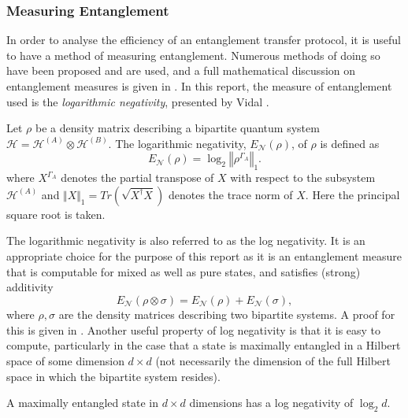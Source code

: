 \subsubsection{Measuring Entanglement}
\label{subsubsection:measure_entanglement}
In order to analyse the efficiency of an entanglement transfer protocol, it is useful to have a method of measuring entanglement.
Numerous methods of doing so have been proposed and are used, and a full
mathematical discussion on entanglement measures is given in \cite{Plenio_2007}.
In this report, the measure of entanglement used is the \emph{logarithmic negativity}, presented by Vidal \cite{Vidal_2002}.
\begin{definition}
    \label{definition:log_neg}
    Let $\rho$ be a density matrix describing a bipartite quantum system $\mathcal{H} = \mathcal{H}^{(A)} \otimes \mathcal{H}^{(B)}$.
    The logarithmic negativity, $E_\mathcal{N}(\rho)$, of $\rho$ is defined as
    \begin{equation}
        E_\mathcal{N}(\rho) = \log_2\left\Vert \rho^{\Gamma_A}\right\Vert_1.
    \end{equation}
    where $X^{\Gamma_A}$ denotes the partial transpose of $X$ with respect to the subsystem $\mathcal{H}^{(A)}$ and $\Vert X\Vert_1 = Tr(\sqrt{X^\dagger X})$ denotes the trace norm of $X$. Here the principal square root is taken.
\end{definition}
The logarithmic negativity is also referred to as the log negativity.
It is an appropriate choice for the purpose of this report as it is an entanglement measure that is computable for mixed as well as pure states, and satisfies (strong) additivity
\begin{equation}
    E_\mathcal{N}(\rho \otimes \sigma) = E_\mathcal{N}(\rho) + E_\mathcal{N}(\sigma),
\end{equation}
where $\rho,\sigma$ are the density matrices describing two bipartite systems.
A proof for this is given in \cite{Vidal_2002}.
Another useful property of log negativity is that it is easy to compute, particularly in the case that a state is maximally entangled in a Hilbert space of some dimension $d\times d$ (not necessarily the dimension of the full Hilbert space in which the bipartite system resides).
\begin{claim}
    \label{claim:maximally_entangled_states}
    A maximally entangled state in $d\times d$ dimensions has a log negativity of $\log_2d$.
\end{claim}
